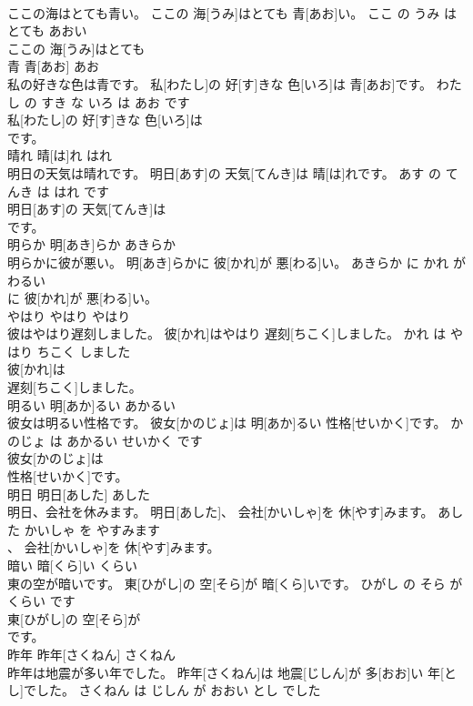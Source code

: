 \documentclass[8pt]{extreport}
\begin{document}
\begin{CJK}{UTF8}{min}
\\	ここの海はとても青い。	ここの 海[うみ]はとても 青[あお]い。	ここ の うみ は とても あおい	
\\	ここの 海[うみ]はとても
\\	青	青[あお]	あお	
\\	私の好きな色は青です。	私[わたし]の 好[す]きな 色[いろ]は 青[あお]です。	わたし の すき な いろ は あお です	
\\	私[わたし]の 好[す]きな 色[いろ]は
\\	です。			
\\	晴れ	晴[は]れ	はれ	
\\	明日の天気は晴れです。	明日[あす]の 天気[てんき]は 晴[は]れです。	あす の てんき は はれ です	
\\	明日[あす]の 天気[てんき]は
\\	です。			
\\	明らか	明[あき]らか	あきらか	
\\	明らかに彼が悪い。	明[あき]らかに 彼[かれ]が 悪[わる]い。	あきらか に かれ が わるい	
\\	に 彼[かれ]が 悪[わる]い。			
\\	やはり	やはり	やはり	
\\	彼はやはり遅刻しました。	彼[かれ]はやはり 遅刻[ちこく]しました。	かれ は やはり ちこく しました	
\\	彼[かれ]は
\\	遅刻[ちこく]しました。			
\\	明るい	明[あか]るい	あかるい	
\\	彼女は明るい性格です。	彼女[かのじょ]は 明[あか]るい 性格[せいかく]です。	かのじょ は あかるい せいかく です	
\\	彼女[かのじょ]は
\\	性格[せいかく]です。			
\\	明日	明日[あした]	あした	
\\	明日、会社を休みます。	明日[あした]、 会社[かいしゃ]を 休[やす]みます。	あした かいしゃ を やすみます	
\\	、 会社[かいしゃ]を 休[やす]みます。			
\\	暗い	暗[くら]い	くらい	
\\	東の空が暗いです。	東[ひがし]の 空[そら]が 暗[くら]いです。	ひがし の そら が くらい です	
\\	東[ひがし]の 空[そら]が
\\	です。			
\\	昨年	昨年[さくねん]	さくねん	
\\	昨年は地震が多い年でした。	昨年[さくねん]は 地震[じしん]が 多[おお]い 年[とし]でした。	さくねん は じしん が おおい とし でした	

\end{CJK}
\end{document}
